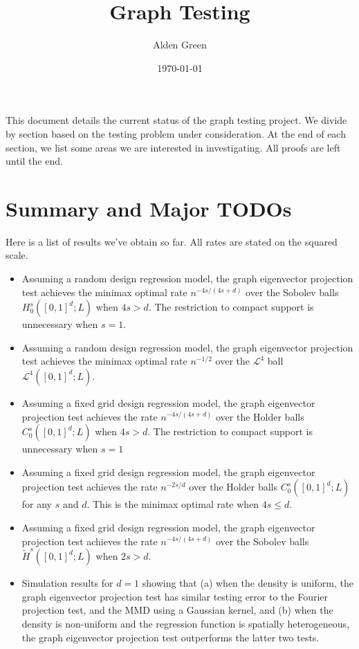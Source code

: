 \documentclass{article}
\newcommand{\1}{\mathbf{1}}
\newcommand{\Leb}{\mathcal{L}}
\newcommand{\wt}[1]{\widetilde{#1}}
\theoremstyle{alden}
\theoremstyle{aldenthm}
\theoremstyle{definition}
\theoremstyle{remark}
\begin{document}
\title{Graph Testing}
\author{Alden Green}
\date{\today}
\maketitle

This document details the current status of the graph testing project. We divide by section based on the testing problem under consideration. At the end of each section, we list some areas we are interested in investigating. All proofs are left until the end.

\section{Summary and Major TODOs}

Here is a list of results we've obtain so far. All rates are stated on the squared scale.
\begin{itemize}
	\item Assuming a random design regression model, the graph eigenvector projection test achieves the minimax optimal rate $n^{-4s/(4s + d)}$ over the Sobolev balls $H_0^s([0,1]^d;L)$ when $4s > d$. The restriction to compact support is unnecessary when $s = 1$.
	\item Assuming a random design regression model, the graph eigenvector projection test achieves the minimax optimal rate $n^{-1/2}$ over the $\Leb^4$ ball $\Leb^4([0,1]^d;L)$. 
	\item Assuming a fixed grid design regression model, the graph eigenvector projection test achieves the rate $n^{-4s/(4s + d)}$ over the Holder balls $C_0^s([0,1]^d;L)$ when $4s > d$. The restriction to compact support is unnecessary when $s = 1$
	\item Assuming a fixed grid design regression model, the graph eigenvector projection test achieves the rate $n^{-2s/d}$ over the Holder balls $C_0^s([0,1]^d;L)$ for any $s$ and $d$. This is the minimax optimal rate when $4s \leq d$.
	\item Assuming a fixed grid design regression model, the graph eigenvector projection test achieves the rate $n^{-4s/(4s + d)}$ over the Sobolev balls $\wt{H}^s([0,1]^d;L)$ when $2s > d$.
	\item Simulation results for $d = 1$ showing that (a) when the density is uniform, the graph eigenvector projection test has similar testing error to the Fourier projection test, and the MMD using a Gaussian kernel, and (b) when the density is non-uniform and the regression function is spatially heterogeneous, the graph eigenvector projection test outperforms the latter two tests. 
\end{itemize}
\end{document}
